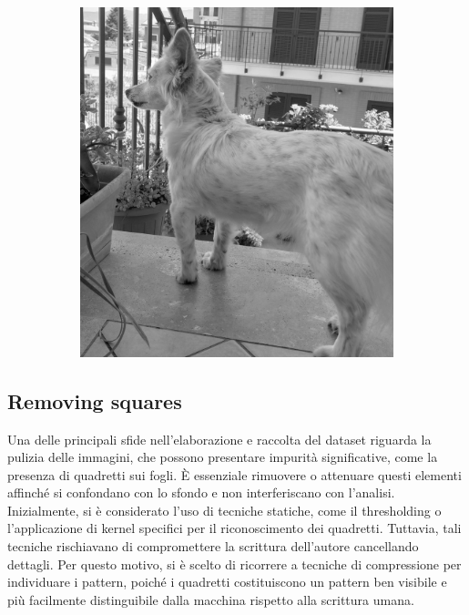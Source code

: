 \begin{figure}[h]
\begin{subfigure}[t]{0.4\linewidth}
        \includegraphics[width=\linewidth]{Figures/example_gray.jpeg}
    \end{subfigure}
\end{figure}
\subsection{Removing squares}
    Una delle principali sfide nell'elaborazione e raccolta del dataset riguarda la pulizia delle immagini, che possono presentare impurità significative, come la presenza di quadretti sui fogli. È essenziale rimuovere o attenuare questi elementi affinché si confondano con lo sfondo e non interferiscano con l'analisi. Inizialmente, si è considerato l'uso di tecniche statiche, come il thresholding o l'applicazione di kernel specifici per il riconoscimento dei quadretti. Tuttavia, tali tecniche rischiavano di compromettere la scrittura dell'autore cancellando dettagli. Per questo motivo, si è scelto di ricorrere a tecniche di compressione per individuare i pattern, poiché i quadretti costituiscono un pattern ben visibile e più facilmente distinguibile dalla macchina rispetto alla scrittura umana.

